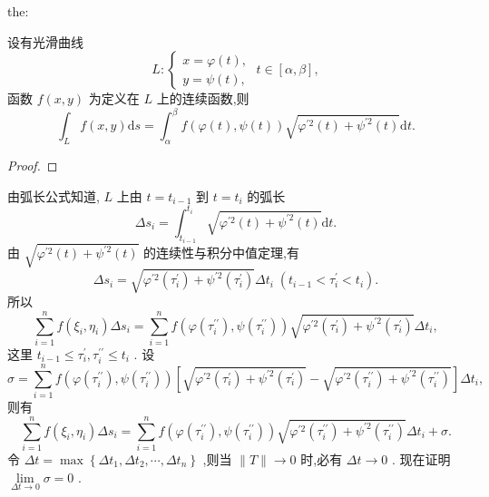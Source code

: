 \begin{theorem}{}{the:}

\end{theorem}
 设有光滑曲线
\[
L : \left\{  {\begin{array}{l} x = \varphi \left( t\right) , \\  y = \psi \left( t\right) , \end{array}\;t \in  \left\lbrack  {\alpha ,\beta }\right\rbrack  ,}\right.
\]
函数 \(f\left( {x,y}\right)\) 为定义在 \(L\) 上的连续函数,则
\[
{\int }_{L}f\left( {x,y}\right) \mathrm{d}s = {\int }_{\alpha }^{\beta }f\left( {\varphi \left( t\right) ,\psi \left( t\right) }\right) \sqrt{{\varphi }^{\prime 2}\left( t\right)  + {\psi }^{\prime 2}\left( t\right) }\mathrm{d}t. \tag{3}
\]
\begin{proof}

\end{proof}
由弧长公式知道, \(L\) 上由 \(t = {t}_{i - 1}\) 到 \(t = {t}_{i}\) 的弧长
\[
\Delta {s}_{i} = {\int }_{{t}_{i - 1}}^{{t}_{i}}\sqrt{{\varphi }^{\prime 2}\left( t\right)  + {\psi }^{\prime 2}\left( t\right) }\mathrm{d}t.
\]
由 \(\sqrt{{\varphi }^{\prime 2}\left( t\right)  + {\psi }^{\prime 2}\left( t\right) }\) 的连续性与积分中值定理,有
\[
\Delta {s}_{i} = \sqrt{{\varphi }^{\prime 2}\left( {\tau }_{i}^{\prime }\right)  + {\psi }^{\prime 2}\left( {\tau }_{i}^{\prime }\right) }\Delta {t}_{i}\;\left( {{t}_{i - 1} < {\tau }_{i}^{\prime } < {t}_{i}}\right) .
\]
所以
\[
\mathop{\sum }\limits_{{i = 1}}^{n}f\left( {{\xi }_{i},{\eta }_{i}}\right) \Delta {s}_{i} = \mathop{\sum }\limits_{{i = 1}}^{n}f\left( {\varphi \left( {\tau }_{i}^{\prime \prime }\right) ,\psi \left( {\tau }_{i}^{\prime \prime }\right) }\right) \sqrt{{\varphi }^{\prime 2}\left( {\tau }_{i}^{\prime }\right)  + {\psi }^{\prime 2}\left( {\tau }_{i}^{\prime }\right) }\Delta {t}_{i},
\]
这里 \({t}_{i - 1} \leq  {\tau }_{i}^{\prime },{\tau }_{i}^{\prime \prime } \leq  {t}_{i}\) . 设
\[
\sigma  = \mathop{\sum }\limits_{{i = 1}}^{n}f\left( {\varphi \left( {\tau }_{i}^{\prime \prime }\right) ,\psi \left( {\tau }_{i}^{\prime \prime }\right) }\right) \left\lbrack  {\sqrt{{\varphi }^{\prime 2}\left( {\tau }_{i}^{\prime }\right)  + {\psi }^{\prime 2}\left( {\tau }_{i}^{\prime }\right) } - \sqrt{{\varphi }^{\prime 2}\left( {\tau }_{i}^{\prime \prime }\right)  + {\psi }^{\prime 2}\left( {\tau }_{i}^{\prime \prime }\right) }}\right\rbrack  \Delta {t}_{i},
\]
则有
\[
\mathop{\sum }\limits_{{i = 1}}^{n}f\left( {{\xi }_{i},{\eta }_{i}}\right) \Delta {s}_{i} = \mathop{\sum }\limits_{{i = 1}}^{n}f\left( {\varphi \left( {\tau }_{i}^{\prime \prime }\right) ,\psi \left( {\tau }_{i}^{\prime \prime }\right) }\right) \sqrt{{\varphi }^{\prime 2}\left( {\tau }_{i}^{\prime \prime }\right)  + {\psi }^{\prime 2}\left( {\tau }_{i}^{\prime \prime }\right) }\Delta {t}_{i} + \sigma . \tag{4}
\]
令 \({\Delta t} = \max \left\{  {\Delta {t}_{1},\Delta {t}_{2},\cdots ,\Delta {t}_{n}}\right\}\) ,则当 \(\parallel T\parallel  \rightarrow  0\) 时,必有 \({\Delta t} \rightarrow  0\) . 现在证明 \(\mathop{\lim }\limits_{{{\Delta t} \rightarrow  0}}\sigma  = 0\) .

